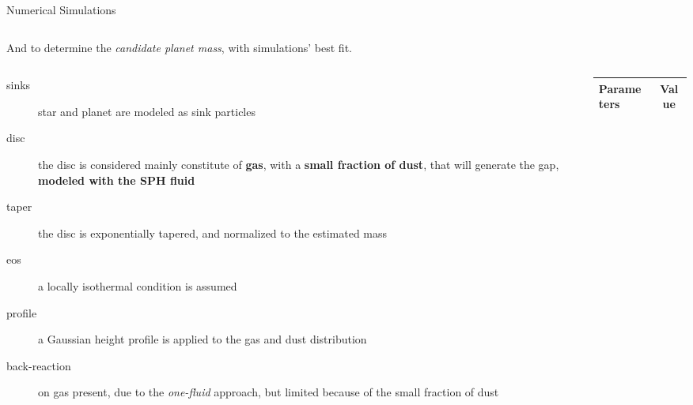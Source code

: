 \documentclass[9pt]{beamer}
\begin{document}
\begin{frame}{Numerical Simulations}
\begin{columns}
\begin{column}{0.6\textwidth}
            And to determine the \textit{candidate planet mass}, with
            simulations' best fit.
            \begin{columns}
                \begin{column}{0.50\textwidth}
                    \begin{description}
                        \item[sinks] star and planet are modeled as sink
                            particles
                        \item[disc] the disc is considered mainly constitute of
                            \textbf{gas}, with a \textbf{small fraction of
                            dust}, that will generate the gap, \textbf{modeled
                            with the SPH fluid}
                        \item[taper] the disc is exponentially tapered, and
                            normalized to the estimated mass
                        \item[eos] a locally isothermal condition is assumed
                        \item[profile] a Gaussian height profile is applied to
                            the gas and dust distribution
                        \item[back-reaction] on gas present, due to the
                            \textit{one-fluid} approach, but limited because of
                            the small fraction of dust
                    \end{description}
                \end{column}
                \begin{column}{0.50\textwidth}
                    \footnotesize
                    \vspace*{20pt}
                    \begin{table}
                        \label{tab:setups} 
                        \centering
                        \begin{tabular}{lc} 
                            \hline
                            \hline
                            Parameters &  Value \\ 
                            \hline


\end{tabular}
\end{table}
\end{column}
\end{columns}
\end{column}
\end{columns}
\end{frame}
\end{document}
